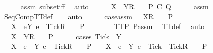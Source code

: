\begin{isabellebody}
\ \ \ \ \isamarkupfalse%
\ assm{}\ subset{\isacharunderscore}iff\ \isamarkupfalse%
\ auto\isanewline
\ \ \isamarkupfalse%
\ {\isachardoublequoteopen}{\isasymrho}\ {\isacharat}\ {\isacharbrackleft}X\ {\isasymunion}\ Y{\isacharbrackright}\isactrlsub R\ {\isacharhash}\ {\isasymsigma}\ {\isasymin}\ P\ {\isacharsemicolon}\isactrlsub C\ Q{\isachardoublequoteclose}\isanewline
\ \ \ \ \isamarkupfalse%
\ assm{}\ \isamarkupfalse%
\ SeqCompTT{\isacharunderscore}def\isanewline
\ \ \isamarkupfalse%
\ auto\isanewline
\ \ \ \ \isamarkupfalse%
\ case{\isacharunderscore}assm{\isacharcolon}\ {\isachardoublequoteopen}{\isasymrho}\ {\isacharat}\ {\isacharbrackleft}X{\isacharbrackright}\isactrlsub R\ {\isacharhash}\ {\isasymsigma}\ {\isasymin}\ P{\isachardoublequoteclose}\isanewline
\ \ \ \ \isamarkupfalse%
\ \isamarkupfalse%
\ {\isachardoublequoteopen}{\isasymrho}\ {\isacharat}\ {\isacharbrackleft}X\ {\isasymunion}\ {\isacharbraceleft}e{\isasymin}Y{\isachardot}\ e\ {\isasymnoteq}\ Tick{\isacharbraceright}{\isacharbrackright}\isactrlsub R\ {\isacharhash}\ {\isasymsigma}\ {\isasymin}\ P{\isachardoublequoteclose}\isanewline
\ \ \ \ \ \ \isamarkupfalse%
\ TT{}{\isacharunderscore}P\ P{\isacharunderscore}assm{}\ \isamarkupfalse%
\ TT{}{\isacharunderscore}def\ \isamarkupfalse%
\ auto\isanewline
\ \ \ \ \isamarkupfalse%
\ \isamarkupfalse%
\ {\isachardoublequoteopen}{\isasymrho}\ {\isacharat}\ {\isacharbrackleft}X\ {\isasymunion}\ Y{\isacharbrackright}\isactrlsub R\ {\isacharhash}\ {\isasymsigma}\ {\isasymin}\ P{\isachardoublequoteclose}\isanewline
\ \ \ \ \isamarkupfalse%
\ {\isacharparenleft}cases\ {\isachardoublequoteopen}Tick\ {\isasymin}\ Y{\isachardoublequoteclose}{\isacharparenright}\isanewline
\ \ \ \ \ \ \isamarkupfalse%
\ {\isachardoublequoteopen}{\isasymrho}\ {\isacharat}\ {\isacharbrackleft}X\ {\isasymunion}\ {\isacharbraceleft}e\ {\isasymin}\ Y{\isachardot}\ e\ {\isasymnoteq}\ Tick{\isacharbraceright}{\isacharbrackright}\isactrlsub R\ {\isacharhash}\ {\isasymsigma}\ {\isasymin}\ P\ {\isasymLongrightarrow}\ {\isasymrho}\ {\isacharat}\ {\isacharbrackleft}X\ {\isasymunion}\ {\isacharbraceleft}e\ {\isasymin}\ Y{\isachardot}\ e\ {\isasymnoteq}\ Tick{\isacharbraceright}\ {\isasymunion}\ {\isacharbraceleft}Tick{\isacharbraceright}{\isacharbrackright}\isactrlsub R\ {\isacharhash}\ {\isasymsigma}\ {\isasymin}\ P{\isachardoublequoteclose}\isanewline

\end{isabellebody}
